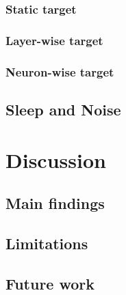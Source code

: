 \documentclass[runningheads]{llncs}
\begin{document}
\subsubsection{Static target}
\subsubsection{Layer-wise target}
\subsubsection{Neuron-wise target}
\subsection{Sleep and Noise}

\section{Discussion}
\subsection{Main findings}
\subsection{Limitations}
\subsection{Future work}



\end{document}
